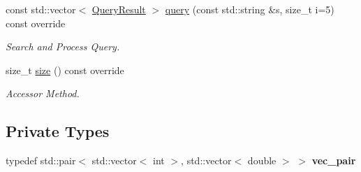\begin{DoxyCompactItemize}
const std\+::vector$<$ \hyperlink{class_query_result}{Query\+Result} $>$ \hyperlink{class_movie_indexer_a06225f4ac31f12e8ed253d0d2682d07a}{query} (const std\+::string \&s, size\+\_\+t i=5) const override
\begin{DoxyCompactList}\small\item\em Search and Process Query. \end{DoxyCompactList}\item 
size\+\_\+t \hyperlink{class_movie_indexer_a16a32702b061de5e38110801f80a7bc9}{size} () const override
\begin{DoxyCompactList}\small\item\em Accessor Method. \end{DoxyCompactList}\end{DoxyCompactItemize}
\subsection*{Private Types}
\begin{DoxyCompactItemize}
\item 
\mbox{\label{class_movie_indexer_a140312f8dacd8509b238c20c19a0bdb7}} 
typedef std\+::pair$<$ std\+::vector$<$ int $>$, std\+::vector$<$ double $>$ $>$ {\bfseries vec\+\_\+pair}
\end{DoxyCompactItemize}
